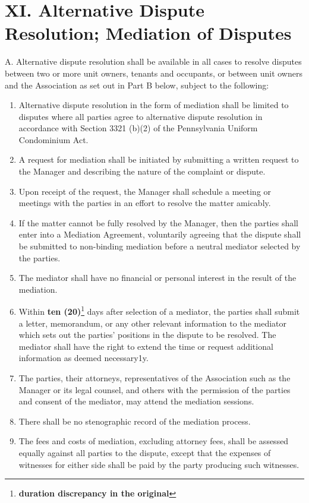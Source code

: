 \documentclass[
]{book}
\begin{document}
\hypertarget{xi.-alternative-dispute-resolution-mediation-of-disputes}{%
\section*{XI. Alternative Dispute Resolution; Mediation of Disputes}\label{xi.-alternative-dispute-resolution-mediation-of-disputes}}

A. Alternative dispute resolution shall be available in all cases to resolve disputes between two or more unit owners, tenants and occupants, or between unit owners and the Association as set out in Part B below, subject to the following:

\begin{enumerate}
\def\labelenumi{\arabic{enumi}.}
\item
  Alternative dispute resolution in the form of mediation shall be limited to disputes where all parties agree to alternative dispute resolution in accordance with Section 3321 (b)(2) of the Pennsylvania Uniform Condominium Act.
\item
  A request for mediation shall be initiated by submitting a written request to the Manager and describing the nature of the complaint or dispute.
\item
  Upon receipt of the request, the Manager shall schedule a meeting or meetings with the parties in an effort to resolve the matter amicably.
\item
  If the matter cannot be fully resolved by the Manager, then the parties shall enter into a Mediation Agreement, voluntarily agreeing that the dispute shall be submitted to non-binding mediation before a neutral mediator selected by the parties.
\item
  The mediator shall have no financial or personal interest in the result of the mediation.
\item
  Within \textbf{ten (20)}\footnote{\textbf{duration discrepancy in the original}} days after selection of a mediator, the parties shall submit a letter, memorandum, or any other relevant information to the mediator which sets out the parties' positions in the dispute to be resolved. The mediator shall have the right to extend the time or request additional information as deemed necessary1y.
\item
  The parties, their attorneys, representatives of the Association such as the Manager or its legal counsel, and others with the permission of the parties and consent of the mediator, may attend the mediation sessions.
\item
  There shall be no stenographic record of the mediation process.
\item
  The fees and costs of mediation, excluding attorney fees, shall be assessed equally against all parties to the dispute, except that the expenses of witnesses for either side shall be paid by the party producing such witnesses.
\end{enumerate}
\end{document}

